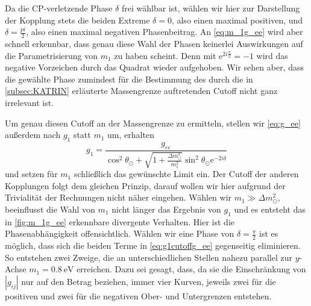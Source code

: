 Da die CP-verletzende Phase $\delta$ frei wählbar ist, wählen wir hier zur Darstellung der Kopplung stets die beiden Extreme $\delta = 0$, also einen maximal positiven, und $\delta = \frac{pi}{2}$, also einen maximal negativen Phasenbeitrag.
An \eqref{eq:m_1g_ee} wird aber schnell erkennbar, dass genau diese Wahl der Phasen keinerlei Auswirkungen auf die Parametrisierung von $m_1$ zu haben scheint.
Denn mit $\mathrm{e}^{2 i \frac{\pi}{2}} = -1$ wird das negative Vorzeichen durch das Quadrat wieder aufgehoben.
Wir sehen aber, dass die gewählte Phase zumindest für die Bestimmung des durch die in \autoref{subsec:KATRIN} erläuterte Massengrenze auftretenden Cutoff nicht ganz irrelevant ist.

Um genau diesen Cutoff an der Massengrenze zu ermitteln, stellen wir \eqref{eq:g_ee} außerdem nach $g_1$ statt $m_1$ um, erhalten
\begin{equation}
    g_1 = \frac{g_{ee}}{\cos^2\theta_\odot + \sqrt{1 + \frac{\Delta m^2_\odot}{m^2_1}} \sin^2\theta_\odot \mathrm{e}^{-2 i \delta}} 
    \label{eq:g1cutoffg_ee}
\end{equation}
und setzen für $m_1$ schließlich das gewünschte Limit ein.
Der Cutoff der anderen Kopplungen folgt dem gleichen Prinzip, darauf wollen wir hier aufgrund der Trivialität der Rechnungen nicht näher eingehen.
Wählen wir $m_1 \gg \Delta m^2_\odot$, beeinflusst die Wahl von $m_1$ nicht länger das Ergebnis von $g_1$ und es entsteht das in \autoref{fig:m_1g_ee} erkennbare divergente Verhalten.
Hier ist die Phasenabhängigkeit offensichtlich.
Wählen wir eine Phase von $\delta = \frac{\pi}{2}$ ist es möglich, dass sich die beiden Terme in \eqref{eq:g1cutoffg_ee} gegenseitig eliminieren.
So entstehen zwei Zweige, die an unterschiedlichen Stellen nahezu parallel zur $y$-Achse $m_1 = \SI{0.8}{\eV}$ erreichen.
Dazu sei gesagt, dass, da sie die Einschränkung von $|g_{i j}|$ nur auf den Betrag beziehen, immer vier Kurven, jeweils zwei für die positiven und zwei für die negativen Ober- und Untergrenzen entstehen.
